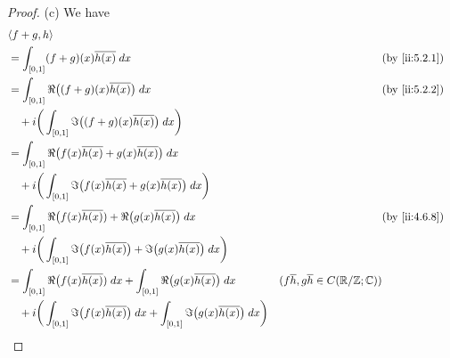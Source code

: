 \begin{proof}{(c)}
  We have
  \begin{align*}
     & \inner*{f + g, h}                                                                                                                                                                                          \\
     & = \int_{[0, 1]} (f + g)(x) \overline{h(x)} \; dx                                                                                    &                                                      & \by{ii:5.2.1} \\
     & = \int_{[0, 1]} \Re\big((f + g)(x) \overline{h(x)}\big) \; dx                                                                       &                                                      & \by{ii:5.2.2} \\
     & \quad + i \bigg(\int_{[0, 1]} \Im\big((f + g)(x) \overline{h(x)}\big) \; dx\bigg)                                                                                                                          \\
     & = \int_{[0, 1]} \Re\big(f(x) \overline{h(x)} + g(x) \overline{h(x)}\big) \; dx                                                                                                                             \\
     & \quad + i \bigg(\int_{[0, 1]} \Im\big(f(x) \overline{h(x)} + g(x) \overline{h(x)}\big) \; dx\bigg)                                                                                                         \\
     & = \int_{[0, 1]} \Re\big(f(x) \overline{h(x)}) + \Re\big(g(x) \overline{h(x)}\big) \; dx                                             &                                                      & \by{ii:4.6.8} \\
     & \quad + i \bigg(\int_{[0, 1]} \Im\big(f(x) \overline{h(x)}\big) + \Im\big(g(x) \overline{h(x)}\big) \; dx\bigg)                                                                                            \\
     & = \int_{[0, 1]} \Re\big(f(x) \overline{h(x)}) \; dx + \int_{[0, 1]} \Re\big(g(x) \overline{h(x)}\big) \; dx                         & (f \overline{h}, g \overline{h} \in C(\R / \Z ; \C))                 \\
     & \quad + i \bigg(\int_{[0, 1]} \Im\big(f(x) \overline{h(x)}\big) \; dx + \int_{[0, 1]} \Im\big(g(x) \overline{h(x)}\big) \; dx\bigg)                                                                        \\

\end{align*}
\end{proof}
